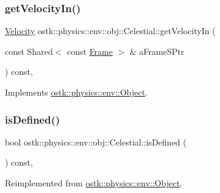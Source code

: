 \subsubsection{\texorpdfstring{get\+Velocity\+In()}{getVelocityIn()}}
{\footnotesize\ttfamily \hyperlink{classostk_1_1physics_1_1coord_1_1_velocity}{Velocity} ostk\+::physics\+::env\+::obj\+::\+Celestial\+::get\+Velocity\+In (\begin{DoxyParamCaption}\item[{const Shared$<$ const \hyperlink{classostk_1_1physics_1_1coord_1_1_frame}{Frame} $>$ \&}]{a\+Frame\+S\+Ptr }\end{DoxyParamCaption}) const\hspace{0.3cm}{\ttfamily [override]}, {\ttfamily [virtual]}}



Implements \hyperlink{classostk_1_1physics_1_1env_1_1_object_a216c8d5e44451fd664e0c7eb3b4934b6}{ostk\+::physics\+::env\+::\+Object}.

\mbox{\label{classostk_1_1physics_1_1env_1_1obj_1_1_celestial_a611b8fe6fcd3787bbf9981ad99dfe471}} 
\subsubsection{\texorpdfstring{is\+Defined()}{isDefined()}}
{\footnotesize\ttfamily bool ostk\+::physics\+::env\+::obj\+::\+Celestial\+::is\+Defined (\begin{DoxyParamCaption}{ }\end{DoxyParamCaption}) const\hspace{0.3cm}{\ttfamily [override]}, {\ttfamily [virtual]}}



Reimplemented from \hyperlink{classostk_1_1physics_1_1env_1_1_object_aaa5131bafbaf86fde7f649e88343a901}{ostk\+::physics\+::env\+::\+Object}.

\mbox{\label{classostk_1_1physics_1_1env_1_1obj_1_1_celestial_a6002c77288a58a9c523c667036a23164}} 
